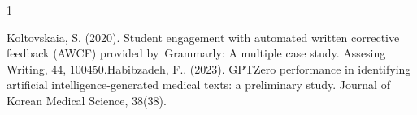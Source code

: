 \documentclass{pginz}
\begin{document}

%


\setcounter{page}{3}




\tableofcontents
{}




1



\listoffigures
{}
\listoftables
{}


\begin{thebibliography}{20}
 Koltovskaia, S. (2020). Student engagement with automated written corrective feedback (AWCF) provided by Grammarly: A multiple case study. Assesing Writing, 44, 100450.Habibzadeh, F..
 (2023). GPTZero performance in identifying artificial intelligence-generated medical texts: a preliminary study. Journal of Korean Medical Science, 38(38).
\end{thebibliography}

\begin{appendices}
%
%
\end{appendices}
\end{document}
